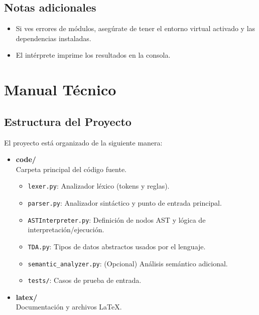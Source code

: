 \documentclass{article}
\begin{document}
\subsection{Notas adicionales}
\begin{itemize}
    \item Si ves errores de módulos, asegúrate de tener el entorno virtual activado y las dependencias instaladas.
    \item El intérprete imprime los resultados en la consola.
\end{itemize}



\section{Manual Técnico}\label{sec:man_t}

\subsection{Estructura del Proyecto}

El proyecto está organizado de la siguiente manera:

\begin{itemize}
    \item \textbf{code/} \\ Carpeta principal del código fuente.
    \begin{itemize}
        \item \texttt{lexer.py}: Analizador léxico (tokens y reglas).
        \item \texttt{parser.py}: Analizador sintáctico y punto de entrada principal.
        \item \texttt{ASTInterpreter.py}: Definición de nodos AST y lógica de interpretación/ejecución.
        \item \texttt{TDA.py}: Tipos de datos abstractos usados por el lenguaje.
        \item \texttt{semantic\_analyzer.py}: (Opcional) Análisis semántico adicional.
        \item \texttt{tests/}: Casos de prueba de entrada.
    \end{itemize}
    \item \textbf{latex/} \\ Documentación y archivos LaTeX.
\end{itemize}
\end{document}
